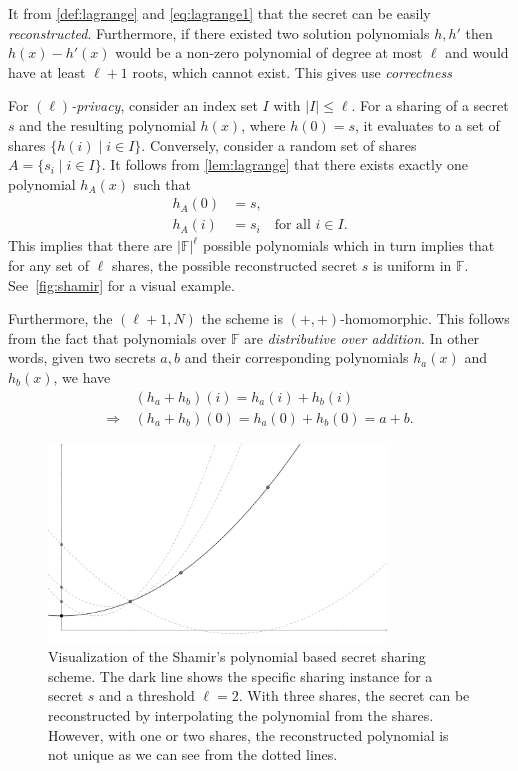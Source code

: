\documentclass[11pt]{report}
\theoremstyle{definition}
\theoremstyle{plain}
\begin{document}
It from \autoref{def:lagrange} and \autoref{eq:lagrange1} that the secret can be easily \textit{reconstructed}. Furthermore, if there existed two solution polynomials $h, h'$ then $h(x) - h'(x)$ would be a non-zero polynomial of degree at most $\ell$ and would have at least $\ell + 1$ roots, which cannot exist. This gives use \textit{correctness}

For \textit{$(\ell)$-privacy}, consider an index set $I$ with $|I| \leq \ell$. For a sharing of a secret $s$ and the resulting polynomial $h(x)$, where $h(0) = s$, it evaluates to a set of shares $\{h(i) \mid i \in I\}$.
Conversely, consider a random set of shares $A = \{s_i \mid i \in I\}$. It follows from \autoref{lem:lagrange} that there exists exactly one polynomial $h_A(x)$ such that
\begin{align*}
  h_A(0) & = s,                                 \\
  h_A(i) & = s_i \quad \text{for all } i \in I.
\end{align*}
This implies that there are $|\mathbb{F}|^\ell$ possible polynomials which in turn implies that for any set of $\ell$ shares, the possible reconstructed secret $s$ is uniform in $\mathbb{F}$. See~\autoref{fig:shamir} for a visual example.

Furthermore, the $(\ell + 1, N)$ the scheme is $(+, +)$-homomorphic. This follows from the fact that polynomials over $\mathbb{F}$ are \textit{distributive over addition}. In other words, given two secrets $a, b$ and their corresponding polynomials $h_a(x)$ and $h_b(x)$, we have
\begin{align*}
                & (h_a + h_b)(i) = h_a(i) + h_b(i)          \\
  \Rightarrow\  & (h_a + h_b)(0) = h_a(0) + h_b(0) = a + b.
\end{align*}

\begin{figure}
  \centering
  \includegraphics[width=0.8\textwidth]{images/shamir.png}
  \caption{Visualization of the Shamir's polynomial based secret sharing scheme. The dark line shows the specific sharing instance for a secret $s$ and a threshold $\ell=2$. With three shares, the secret can be reconstructed by interpolating the polynomial from the shares. However, with one or two shares, the reconstructed polynomial is not unique as we can see from the dotted lines.}\label{fig:shamir}
\end{figure}
\end{document}
